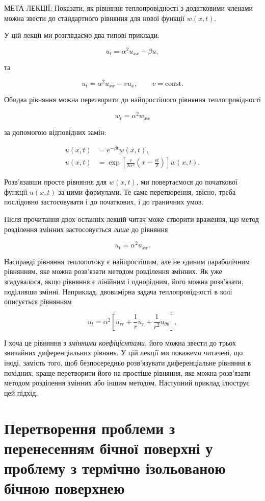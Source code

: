\documentclass[
  ukrainian,
]{article}
\begin{document}
МЕТА ЛЕКЦІЇ: Показати, як рівняння теплопровідності з додатковими
членами можна звести до стандартного рівняння для нової функції
\(w(x,t)\).

У цій лекції ми розглядаємо два типові приклади:

\[
u_t = \alpha^2 u_{xx} - \beta u,
\]

та

\[
u_t = \alpha^2 u_{xx} - v u_x, \qquad v=\text{const}.
\]

Обидва рівняння можна перетворити до найпростішого рівняння
теплопровідності

\[
w_t = \alpha^2 w_{xx}
\]

за допомогою відповідних замін:

\[
\begin{aligned}
u(x,t)&=e^{-\beta t}w(x,t),\\
u(x,t)&=\exp\!\left[\frac{v}{2\alpha^2}\!\left(x-\frac{vt}{2}\right)\right]w(x,t).
\end{aligned}
\]

Розв'язавши просте рівняння для \(w(x,t)\), ми повертаємося до
початкової функції \(u(x,t)\) за цими формулами. Те саме перетворення,
звісно, треба послідовно застосовувати і до початкових, і до граничних
умов.

Після прочитання двох останніх лекцій читач може створити враження, що
метод розділення змінних застосовується \emph{лише} до рівняння

\[
u_t = \alpha^2 u_{xx}.
\]

Насправді рівняння теплопотоку є найпростішим, але не єдиним
параболічним рівнянням, яке можна розв'язати методом розділення змінних.
Як уже згадувалося, якщо рівняння є лінійним і однорідним, його можна
розв'язати, поділивши змінні. Наприклад, двовимірна задача
теплопровідності в колі описується рівнянням

\[
u_t = \alpha^2 \left[ u_{rr} + \frac{1}{r} u_r + \frac{1}{r^2} u_{\theta\theta} \right],
\]

І хоча це рівняння з \emph{змінними коефіцієнтами}, його можна звести до
трьох звичайних диференціальних рівнянь. У цій лекції ми покажемо
читачеві, що іноді, замість того, щоб безпосередньо розв'язувати
диференціальне рівняння в похідних, краще перетворити його на простіше
рівняння, яке можна розв'язати методом розділення змінних або іншим
методом. Наступний приклад ілюструє цей підхід.

\section{Перетворення проблеми з перенесенням бічної поверхні у проблему
з термічно ізольованою бічною
поверхнею}\label{ux43fux435ux440ux435ux442ux432ux43eux440ux435ux43dux43dux44f-ux43fux440ux43eux431ux43bux435ux43cux438-ux437-ux43fux435ux440ux435ux43dux435ux441ux435ux43dux43dux44fux43c-ux431ux456ux447ux43dux43eux457-ux43fux43eux432ux435ux440ux445ux43dux456-ux443-ux43fux440ux43eux431ux43bux435ux43cux443-ux437-ux442ux435ux440ux43cux456ux447ux43dux43e-ux456ux437ux43eux43bux44cux43eux432ux430ux43dux43eux44e-ux431ux456ux447ux43dux43eux44e-ux43fux43eux432ux435ux440ux445ux43dux435ux44e}
\end{document}
